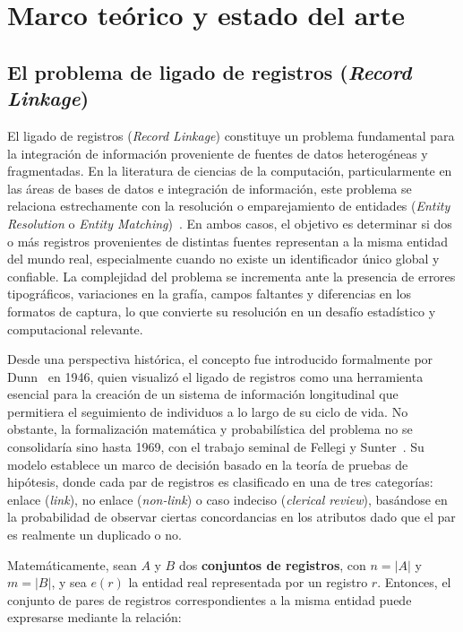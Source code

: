 \chapter{Marco teórico y estado del arte}


\section{El problema de ligado de registros (\textit{Record Linkage})}

El ligado de registros (\textit{Record Linkage}) constituye un problema fundamental para la integración de información proveniente de fuentes de datos heterogéneas y fragmentadas. En la literatura de ciencias de la computación, particularmente en las áreas de bases de datos e integración de información, este problema se relaciona estrechamente con la resolución o emparejamiento de entidades (\textit{Entity Resolution} o \textit{Entity Matching})~\cite{li2020,cappuzzo2020}. En ambos casos, el objetivo es determinar si dos o más registros provenientes de distintas fuentes representan a la misma entidad del mundo real, especialmente cuando no existe un identificador único global y confiable. La complejidad del problema se incrementa ante la presencia de errores tipográficos, variaciones en la grafía, campos faltantes y diferencias en los formatos de captura, lo que convierte su resolución en un desafío estadístico y computacional relevante.

Desde una perspectiva histórica, el concepto fue introducido formalmente por Dunn~\cite{dunn1946} en 1946, quien visualizó el ligado de registros como una herramienta esencial para la creación de un sistema de información longitudinal que permitiera el seguimiento de individuos a lo largo de su ciclo de vida. No obstante, la formalización matemática y probabilística del problema no se consolidaría sino hasta 1969, con el trabajo seminal de Fellegi y Sunter~\cite{fellegi1969}. Su modelo establece un marco de decisión basado en la teoría de pruebas de hipótesis, donde cada par de registros es clasificado en una de tres categorías: enlace (\textit{link}), no enlace (\textit{non-link}) o caso indeciso (\textit{clerical review}), basándose en la probabilidad de observar ciertas concordancias en los atributos dado que el par es realmente un duplicado o no.

Matemáticamente, sean $A$ y $B$ dos \textbf{conjuntos de registros}, con $n=|A|$ y $m=|B|$, y sea $e(r)$ la entidad real representada por un registro $r$. Entonces, el conjunto de pares de registros correspondientes a la misma entidad puede expresarse mediante la relación:

